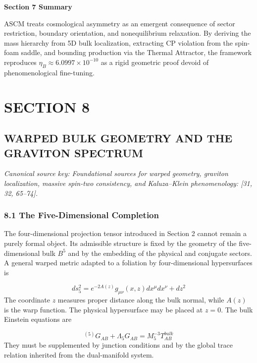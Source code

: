 \documentclass[aps,prd,onecolumn,superscriptaddress,nofootinbib,longbibliography,10pt]{revtex4-2}
\begin{document}
\textbf{Section 7 Summary}


ASCM treats cosmological asymmetry as an emergent consequence of sector restriction, boundary orientation, and nonequilibrium relaxation. By deriving the mass hierarchy from 5D bulk localization, extracting CP violation from the spin-foam saddle, and bounding production via the Thermal Attractor, the framework reproduces \(\eta_B \approx 6.0997 \times 10^{-10}\) as a rigid geometric proof devoid of phenomenological fine-tuning.




 

  
\section*{SECTION 8}

  
\subsection*{WARPED BULK GEOMETRY AND THE GRAVITON SPECTRUM}

  \textit{Canonical source key: Foundational sources for warped geometry, graviton localization, massive spin-two consistency, and Kaluza–Klein phenomenology: [31, 32, 65–74].}


  
\subsubsection*{8.1 The Five-Dimensional Completion}

  The four-dimensional projection tensor introduced in Section 2 cannot remain a purely formal object. Its admissible structure is fixed by the geometry of the five-dimensional bulk \(B^5\) and by the embedding of the physical and conjugate sectors. A general warped metric adapted to a foliation by four-dimensional hypersurfaces is


  \[ ds_5^2 = e^{-2A(z)} g_{\mu\nu}(x,z) dx^\mu dx^\nu + dz^2 \]
  The coordinate \(z\) measures proper distance along the bulk normal, while \(A(z)\) is the warp function. The physical hypersurface may be placed at \(z = 0\). The bulk Einstein equations are


  \[ {}^{(5)}G_{AB} + \Lambda_5 G_{AB} = M_5^{-3} T^{bulk}_{AB} \]
  They must be supplemented by junction conditions and by the global trace relation inherited from the dual-manifold system.
\end{document}
